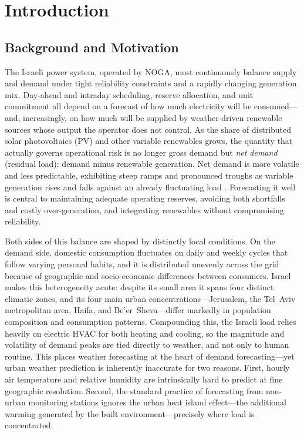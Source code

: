 \documentclass[12pt,a4paper]{article}
\begin{document}
\section{Introduction}
\label{sec:intro}

\subsection{Background and Motivation}

The Israeli power system, operated by NOGA, must continuously balance supply and demand
under tight reliability constraints and a rapidly changing generation mix. Day-ahead and
intraday scheduling, reserve allocation, and unit commitment all depend on a forecast of
how much electricity will be consumed---and, increasingly, on how much will be supplied
by weather-driven renewable sources whose output the operator does not control. As the
share of distributed solar photovoltaics (PV) and other variable renewables grows, the
quantity that actually governs operational risk is no longer gross demand but
\emph{net demand} (residual load): demand minus renewable generation. Net demand is more
volatile and less predictable, exhibiting steep ramps and pronounced troughs as variable
generation rises and falls against an already fluctuating load
\parencite{denholm2015overgeneration}. Forecasting it well is
central to maintaining adequate operating reserves, avoiding both shortfalls and costly
over-generation, and integrating renewables without compromising reliability.

Both sides of this balance are shaped by distinctly local conditions. On the demand side,
domestic consumption fluctuates on daily and weekly cycles that follow varying personal
habits, and it is distributed unevenly across the grid because of geographic and
socio-economic differences between consumers. Israel makes this heterogeneity acute:
despite its small area it spans four distinct climatic zones, and its four main urban
concentrations---Jerusalem, the Tel~Aviv metropolitan area, Haifa, and Be'er~Sheva---differ
markedly in population composition and consumption patterns. Compounding this, the Israeli
load relies heavily on electric HVAC for both heating and cooling, so the magnitude and
volatility of demand peaks are tied directly to weather, and not only to human routine.
This places weather forecasting at the heart of demand forecasting---yet urban weather
prediction is inherently inaccurate for two reasons. First, hourly air temperature and
relative humidity are intrinsically hard to predict at fine geographic resolution. Second,
the standard practice of forecasting from non-urban monitoring stations ignores the urban
heat island effect---the additional warming generated by the built environment---precisely
where load is concentrated.
\end{document}
